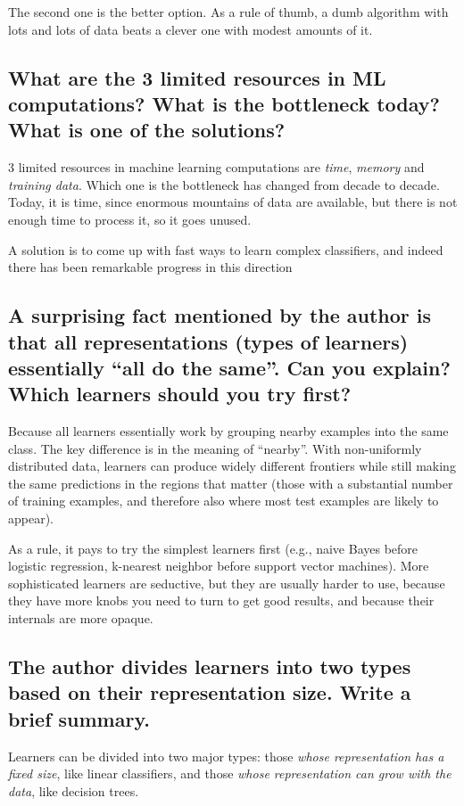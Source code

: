 \documentclass[10pt]{article}
\begin{document}
The second one is the better option. As a rule of thumb, a dumb algorithm with
lots and lots of data beats a clever one with modest amounts of it.

\subsection{What are the 3 limited resources in ML computations? What is the
bottleneck today? What is one of the solutions?}

3 limited resources in machine learning computations are \emph{time},
\emph{memory} and \emph{training data}. Which one is the bottleneck has changed
from decade to decade. Today, it is time, since enormous mountains of data are
available, but there is not enough time to process it, so it goes unused.

A solution is to come up with fast ways to learn complex classifiers, and
indeed there has been remarkable progress in this direction

\subsection{A surprising fact mentioned by the author is that all
representations (types of learners) essentially ``all do the same''. Can you
explain? Which learners should you try first?}

Because all learners essentially work by grouping nearby examples into the
same class. The key difference is in the meaning of ``nearby''. With
non-uniformly distributed data, learners can produce widely different frontiers
while still making the same predictions in the regions that matter (those with
a substantial number of training examples, and therefore also where most test
examples are likely to appear).

As a rule, it pays to try the simplest learners first (e.g., naive Bayes before
logistic regression, k-nearest neighbor before support vector machines). More
sophisticated learners are seductive, but they are usually harder to use,
because they have more knobs you need to turn to get good results, and because
their internals are more opaque.

\subsection{The author divides learners into two types based on their
representation size. Write a brief summary.}

Learners can be divided into two major types: those \emph{whose representation
has a fixed size}, like linear classifiers, and those \emph{whose
representation can grow with the data}, like decision trees.
\end{document}
